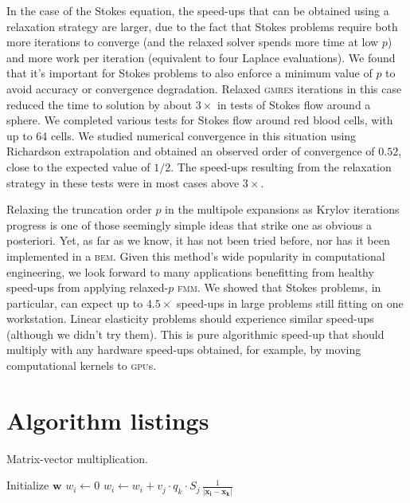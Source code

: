 \documentclass[smallcondensed,final]{svjour3}
\newcommand{\gpu}{\textsc{gpu}}
\newcommand{\bem}{\textsc{bem}\xspace}
\newcommand{\fmm}{\textsc{fmm}\xspace}
\newcommand{\gmres}{\textsc{gmres}\xspace}
\begin{document}
In the case of the Stokes equation, the speed-ups that can be obtained using a relaxation strategy are larger, due to the fact that Stokes problems require both more iterations to converge (and the relaxed solver spends more time at low $p$) and more work per iteration (equivalent to four Laplace evaluations). 
We found that it's important for Stokes problems to also enforce a minimum value of $p$ to avoid accuracy or convergence degradation.
Relaxed \gmres iterations in this case reduced the time to solution by about $3\times$ in tests of Stokes flow around a sphere. 
We completed various tests for Stokes flow around red blood cells, with up to 64 cells. We studied numerical convergence in this situation using Richardson extrapolation and obtained an observed order of convergence of $0.52$, close to the expected value of $1/2$. The speed-ups resulting from the relaxation strategy in these tests were in most cases above $3\times$.

Relaxing the truncation order $p$ in the multipole expansions as Krylov iterations progress is one of those seemingly simple ideas that strike one as obvious a posteriori. Yet, as far as we know, it has not been tried before, nor has it been implemented in a \bem. Given this method's wide popularity in computational engineering, we look forward to many applications benefitting from healthy speed-ups from applying relaxed-$p$ \fmm. We  showed that Stokes problems, in particular, can expect up to $4.5\times$ speed-ups in large problems still fitting on one workstation. Linear elasticity problems should experience similar speed-ups (although we didn't try them). This is pure algorithmic speed-up that should multiply with any hardware speed-ups obtained, for example, by moving computational kernels to \gpu s.

\appendix
\section{Algorithm listings}\label{sec:algorithms}
 
 \begin{algorithm}
 \footnotesize
	\caption{Matrix-vector multiplication.}
	\label{alg:matvec}
	\begin{algorithmic}
		\State Initialize $\mathbf{w}$
			\State $w_i \gets 0$
				\State $w_i \gets w_i + v_j \cdot q_k \cdot S_j \, \frac{1}{|\mathbf{x_i}-\mathbf{x_k}|}$
				\EndFor
			\EndFor
		\EndFor 
	\end{algorithmic}
\end{algorithm}
\end{document}
